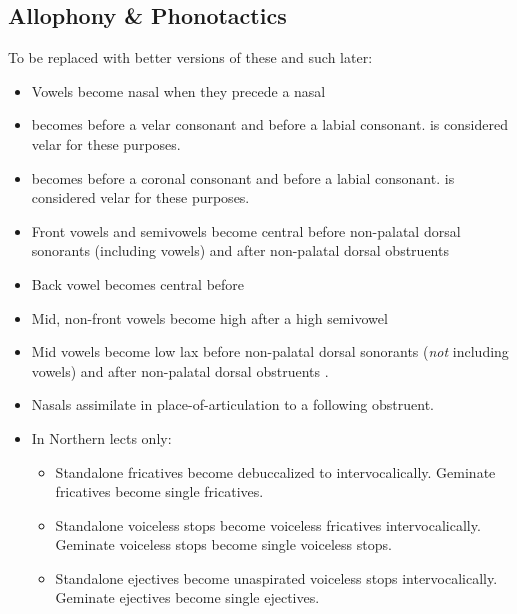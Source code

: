 \subsection{Allophony \& Phonotactics}

To be replaced with better versions of these and such later:

\begin{itemize}
    \item Vowels  become nasal  when they precede a nasal
    \item {} becomes \bripa{\vell} before a velar consonant and \bripa{\bilav\dwnwrd} before a labial consonant.  is considered velar for these purposes.
    \item \phipa{\vell} becomes \bripa{\darkl} before a coronal consonant and  before a labial consonant.  is considered velar for these purposes.
    \item Front vowels and semivowels  become central  before non-palatal dorsal sonorants (including vowels)  and after non-palatal dorsal obstruents 
    \item Back vowel  becomes central \bripa{\sche} before 
    \item Mid, non-front vowels  become high  after a high semivowel 
    \item Mid vowels  become low lax  before non-palatal dorsal sonorants (\emph{not} including vowels)  and after non-palatal dorsal obstruents .
    \item Nasals assimilate in place-of-articulation to a following obstruent.
    \item In Northern lects only:
    \begin{itemize}
        \item Standalone fricatives become debuccalized to  intervocalically. Geminate fricatives become single fricatives.
        \item Standalone voiceless stops become voiceless fricatives intervocalically. Geminate voiceless stops become single voiceless stops.
        \item Standalone ejectives become unaspirated voiceless stops intervocalically. Geminate ejectives become single ejectives.

\end{itemize}
\end{itemize}
